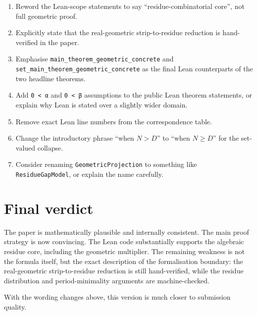 \documentclass[11pt]{article}
\begin{document}
\begin{enumerate}[label=\arabic*.]
    \item Reword the Lean-scope statements to say ``residue-combinatorial
          core'', not full geometric proof.
    \item Explicitly state that the real-geometric strip-to-residue reduction
          is hand-verified in the paper.
    \item Emphasise
          \texttt{main\_theorem\_geometric\_concrete} and
          \texttt{set\_main\_theorem\_geometric\_concrete} as the final Lean
          counterparts of the two headline theorems.
    \item Add \texttt{0 < α} and \texttt{0 < β} assumptions to the public Lean
          theorem statements, or explain why Lean is stated over a slightly
          wider domain.
    \item Remove exact Lean line numbers from the correspondence table.
    \item Change the introductory phrase ``when \(N>D\)'' to
          ``when \(N\ge D\)'' for the set-valued collapse.
    \item Consider renaming \texttt{GeometricProjection} to something like
          \texttt{ResidueGapModel}, or explain the name carefully.
\end{enumerate}

\section{Final verdict}

The paper is mathematically plausible and internally consistent.  The main
proof strategy is now convincing.  The Lean code substantially supports the
algebraic residue core, including the geometric multiplier.  The remaining
weakness is not the formula itself, but the exact description of the
formalisation boundary: the real-geometric strip-to-residue reduction is still
hand-verified, while the residue distribution and period-minimality arguments
are machine-checked.

With the wording changes above, this version is much closer to submission
quality.
\end{document}
